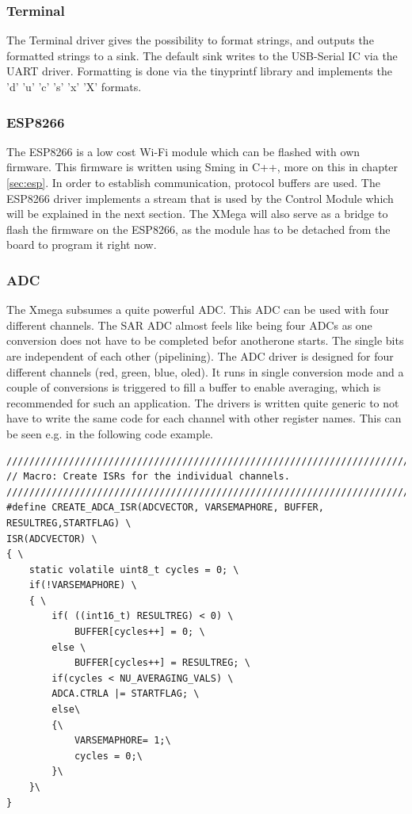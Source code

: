 \subsubsection{Terminal}
The Terminal driver gives the possibility to format strings, and outputs the formatted strings to a sink. The default sink writes to the USB-Serial IC via the UART driver. Formatting is done via the tinyprintf library\cite{sparetimelabs:tinyprintf} and implements the 'd' 'u' 'c' 's' 'x' 'X' formats.
\subsubsection{ESP8266}
The ESP8266 is a low cost Wi-Fi module which can be flashed with own firmware. This firmware is written using Sming in C++, more on this in chapter \ref{sec:esp}. In order to establish communication, protocol buffers are used. The ESP8266 driver implements a stream that is used by the Control Module which will be explained in the next section. The XMega will also serve as a bridge to flash the firmware on the ESP8266, as the module has to be detached from the board to program it right now. 

\subsubsection{ADC}
The Xmega subsumes a quite powerful ADC. This ADC can be used with four
different channels. The SAR ADC almost feels like being four ADCs as one
conversion does not have to be completed befor anotherone starts. The single
bits are independent of each other (pipelining). The ADC driver is designed for
four different channels (red, green, blue, oled). It runs in single conversion
mode and a couple of conversions is triggered to fill a buffer to enable
averaging, which is recommended for such an application. The drivers is written
quite generic to not have to write the same code for each channel with other
register names. This can be seen e.g. in the following code example. 

\begin{verbatim}
/////////////////////////////////////////////////////////////////////////////////
// Macro: Create ISRs for the individual channels.
/////////////////////////////////////////////////////////////////////////////////
#define CREATE_ADCA_ISR(ADCVECTOR, VARSEMAPHORE, BUFFER, RESULTREG,STARTFLAG) \ 
ISR(ADCVECTOR) \ 
{ \ 
	static volatile uint8_t cycles = 0; \
	if(!VARSEMAPHORE) \ 
	{ \ 
		if( ((int16_t) RESULTREG) < 0) \
			BUFFER[cycles++] = 0; \ 
		else \ 
			BUFFER[cycles++] = RESULTREG; \ 
		if(cycles < NU_AVERAGING_VALS) \ 
		ADCA.CTRLA |= STARTFLAG; \ 
		else\ 
		{\ 
			VARSEMAPHORE= 1;\ 
			cycles = 0;\ 
		}\ 
	}\
}
\end{verbatim}

